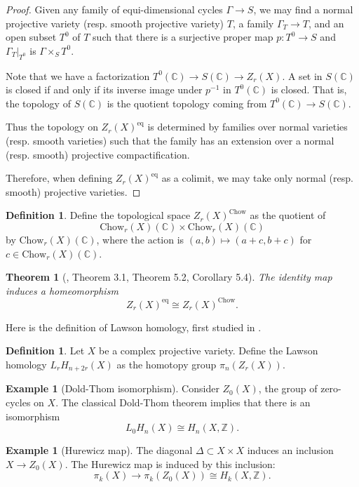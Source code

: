 \documentclass{amsart}
\newtheorem{thm}[theorem]{Theorem}
\theoremstyle{definition}
\newtheorem{defn}[theorem]{Definition}
\newtheorem{ex}[theorem]{Example}
\theoremstyle{remark}
\newcommand{\mbb}{\mathbb}
\newcommand{\ZZ}{\mbb{Z}}
\newcommand{\CC}{\mbb{C}}
\newcommand{\eq}{\text{eq}}
\newcommand{\ch}{\text{Chow}}
\begin{document}
\begin{proof}
Given any family of equi-dimensional cycles $\Gamma \to S$, we may find a normal projective variety (resp. smooth projective variety) $T$, a family $\Gamma_T \to T$, and an open subset $T^0$ of $T$ such that there is a surjective proper map $p: T^0 \to S$ and $\Gamma_T|_{T^0}$ is $\Gamma \times_S T^0$. 

Note that we have a factorization $T^0(\CC) \to S(\CC) \to Z_r(X)$.
A set in $S(\CC)$ is closed if and only if its inverse image under $p^{-1}$ in $T^0(\CC)$ is closed.
 That is, the topology of $S(\CC)$ is the quotient topology coming from $T^0(\CC) \to S(\CC)$.  

Thus the topology on $Z_r(X)^\eq$ is determined by families over normal varieties (resp. smooth varieties) such that the family has an extension over a normal (resp. smooth) projective compactification.

Therefore, when defining $Z_r(X)^\eq$ as a colimit, we may take only normal (resp. smooth) projective varieties.
\end{proof}


\begin{defn}\label{def:chow}
Define the topological space $Z_r(X)^\ch$ as the quotient of 
\[
\ch_r(X)(\CC) \times \ch_r(X)(\CC)
\]
by $\ch_r(X)(\CC)$, where the action is $(a, b) \mapsto (a+c, b+c)$ for $c \in \ch_r(X) (\CC)$.
\end{defn}

\begin{thm}[\cite{LF_fl_eq_chow}, Theorem 3.1, Theorem 5.2, Corollary 5.4]
The identity map induces a homeomorphism
\[
 Z_r(X)^\eq \cong Z_r(X)^\ch.
\]
\end{thm}


Here is the definition of Lawson homology, first studied in \cite{Lawson_LawsonHomology}.
\begin{defn}\label{def:lawson}
Let $X$ be a complex projective variety. Define the Lawson homology $L_rH_{n+2r}(X)$ as the homotopy group $\pi_n(Z_r(X))$.
\end{defn}

\begin{ex}[Dold-Thom isomorphism]\label{doldthom}
Consider $Z_0(X)$, the group of zero-cycles on $X$. The classical Dold-Thom theorem implies that there is an isomorphism
\[
L_0H_n(X) \cong H_n(X, \ZZ).
\]
\end{ex}

\begin{ex}[Hurewicz map]
The diagonal $\Delta\subset X\times X$ induces an inclusion $X \to Z_0(X)$. The Hurewicz map is induced by this inclusion: 
\[
\pi_k(X) \to \pi_k(Z_0(X)) \cong H_k(X, \ZZ).
\]
\end{ex}
\end{document}
